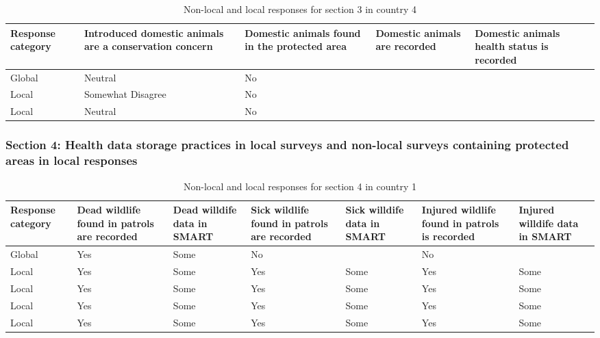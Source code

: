 \documentclass[
  letterpaper,
  DIV=11,
  numbers=noendperiod]{scrartcl}
\begin{document}
\begin{table}[H]

\caption{Non-local and local responses for section 3 in country 4}
\centering
\begin{tabular}[t]{>{\raggedright\arraybackslash}p{2cm}|>{\raggedright\arraybackslash}p{3cm}|>{\raggedright\arraybackslash}p{2cm}|>{\raggedright\arraybackslash}p{2cm}|>{\raggedright\arraybackslash}p{2cm}}
\hline
Response
category & Introduced domestic
animals are
a conservation
concern & Domestic animals
found in the
protected area & Domestic animals
are recorded & Domestic animals
health status
is recorded\\
\hline
Global & Neutral & No &  & \\
\hline
Local & Somewhat Disagree & No &  & \\
\hline
Local & Neutral & No &  & \\
\hline
\end{tabular}
\end{table}

\hypertarget{section-4-health-data-storage-practices-in-local-surveys-and-non-local-surveys-containing-protected-areas-in-local-responses}{%
\subsubsection{Section 4: Health data storage practices in local surveys
and non-local surveys containing protected areas in local
responses}\label{section-4-health-data-storage-practices-in-local-surveys-and-non-local-surveys-containing-protected-areas-in-local-responses}}

\begin{table}[H]

\caption{Non-local and local responses for section 4 in country 1}
\centering
\begin{tabular}[t]{>{\raggedright\arraybackslash}p{2cm}|>{\raggedright\arraybackslash}p{2cm}|>{\raggedright\arraybackslash}p{2cm}|>{\raggedright\arraybackslash}p{2cm}|>{\raggedright\arraybackslash}p{2cm}|>{\raggedright\arraybackslash}p{2cm}|>{\raggedright\arraybackslash}p{2cm}}
\hline
Response
category & Dead wildlife
found in patrols
are recorded & Dead willdife
data in SMART & Sick wildlife
found in patrols
are recorded & Sick willdife
data in SMART & Injured wildlife
found in patrols
is recorded & Injured willdife
data in SMART\\
\hline
Global & Yes & Some & No &  & No & \\
\hline
Local & Yes & Some & Yes & Some & Yes & \vphantom{3} Some\\
\hline
Local & Yes & Some & Yes & Some & Yes & \vphantom{2} Some\\
\hline
Local & Yes & Some & Yes & Some & Yes & \vphantom{1} Some\\
\hline
Local & Yes & Some & Yes & Some & Yes & Some\\
\hline
\end{tabular}
\end{table}
\end{document}
